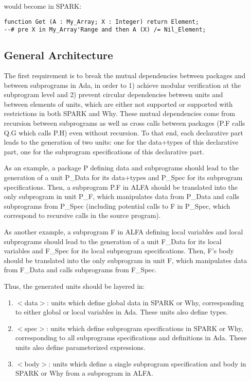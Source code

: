 \documentclass{article}
\begin{document}
would become in SPARK:

\begin{verbatim}
function Get (A : My_Array; X : Integer) return Element;
--# pre X in My_Array'Range and then A (X) /= Nil_Element;
\end{verbatim}

\subsection{General Architecture}

The first requirement is to break the mutual dependencies between packages and
between subprograms in Ada, in order to 1) achieve modular verification at the
subprogram level and 2) prevent circular dependencies between units and between
elements of units, which are either not supported or supported with
restrictions in both SPARK and Why. These mutual dependencies come from
recursion between subprograms as well as cross calls between packages (P.F
calls Q.G which calls P.H) even without recursion. To that end, each
declarative part leads to the generation of two units: one for the data+types
of this declarative part, one for the subprogram specifications of this
declarative part.

As an example, a package P defining data and subprograms should lead to the
generation of a unit P\_Data for its data+types and P\_Spec for its subprogram
specifications. Then, a subprogram P.F in ALFA should be translated into the
only subprogram in unit P\_F, which manipulates data from P\_Data and calls
subprograms from P\_Spec (including potential calls to F in P\_Spec, which
correspond to recursive calls in the source program).

As another example, a subprogram F in ALFA defining local variables and local
subprograms should lead to the generation of a unit F\_Data for its local
variables and F\_Spec for its local subprogram specifications. Then, F's body
should be translated into the only subprogram in unit F, which manipulates data
from F\_Data and calls subprograms from F\_Spec.

Thus, the generated units should be layered in:
\begin{enumerate}
\item $<$data$>$: units which define global data in SPARK or Why, corresponding
  to either global or local variables in Ada. These units also define types.
\item $<$spec$>$: units which define subprogram specifications in SPARK or Why,
  corresponding to all subprograms specifications and definitions in Ada. These
  units also define parameterized expressions.
\item $<$body$>$: units which define a single subprogram specification and body
  in SPARK or Why from a subprogram in ALFA.
\end{enumerate}
\end{document}
